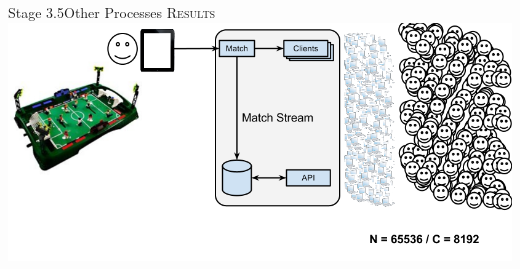 \documentclass[utf8]{beamer}
\begin{document}
\begin{frame}{Stage 3.5}{Other Processes}
	\textsc{Results}
	\includegraphics[top=-1,width=\textwidth]{img/MatchStream-3.png}
\end{frame}
\end{document}
